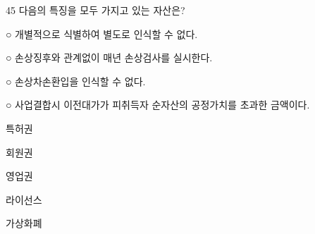 \begin{question}{45}
다음의 특징을 모두 가지고 있는 자산은?
\begin{framedtext}
○ 개별적으로 식별하여 별도로 인식할 수 없다. \par
○ 손상징후와 관계없이 매년 손상검사를 실시한다. \par
○ 손상차손환입을 인식할 수 없다. \par
○ 사업결합시 이전대가가 피취득자 순자산의 공정가치를 초과한 금액이다. \par
\end{framedtext}
\begin{choices}
  \item 특허권
  \item 회원권
  \item 영업권
  \item 라이선스
  \item 가상화폐
\end{choices}
\end{question}
